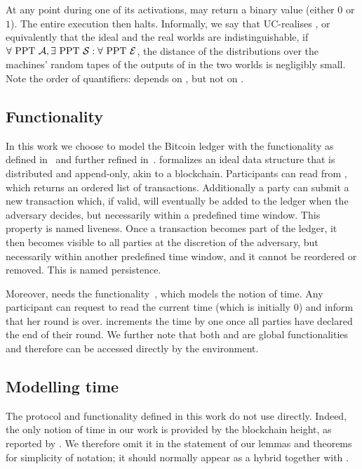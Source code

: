   At any point during one of its activations, \environment may return a binary
  value (either $0$ or $1$). The entire execution then halts. Informally, we say that \prot
  UC-realises \func, or equivalently that the ideal and the real worlds are
  indistinguishable, if $\forall \text{ PPT } \mathcal{A}, \exists \text{ PPT }
  \mathcal{S}: \forall \text{ PPT } \mathcal{E}$, the distance of the
  distributions over the machines' random tapes of the outputs of \environment
  in the two worlds is negligibly small. Note the order of quantifiers:
  \simulator depends on \adversary, but not on \environment.

  \subsection{\ledger Functionality}
  In this work we choose to model the Bitcoin ledger with the \ledger
  functionality as defined in~\cite{BMTZ17} and further refined
  in~\cite{genesis}. \ledger formalizes an ideal data structure that is
  distributed and append-only, akin to a blockchain. Participants can read from
  \ledger, which returns an ordered list of transactions. Additionally a party
  can submit a new transaction which, if valid, will eventually be added to the
  ledger when the adversary decides, but necessarily within a predefined time
  window. This property is named liveness. Once a transaction becomes part of
  the ledger, it then becomes visible to all parties at the discretion of the
  adversary, but necessarily within another predefined time window, and it
  cannot be reordered or removed. This is named persistence.

  Moreover, \ledger needs the \gFclock
  functionality~\cite{DBLP:conf/tcc/KatzMTZ13}, which models the notion of time.
  Any \gFclock participant can request to read the current time (which is
  initially 0) and inform \gFclock that her round is over. \gFclock increments the
  time by one once all parties have declared the end of their round. We further note that both
  \ledger and \gFclock are global functionalities~\cite{globaluc} and therefore
  can be accessed directly by the environment.

  \subsection{Modelling time}
  The protocol and functionality defined in this work do not use \gFclock
  directly. Indeed, the only notion of time in our work is provided by the
  blockchain height, as reported by \ledger. We therefore omit it in the
  statement of our lemmas and theorems for simplicity of notation; it should
  normally appear as a hybrid together with \ledger.

